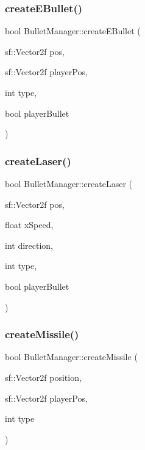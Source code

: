 \subsubsection{\texorpdfstring{create\+E\+Bullet()}{createEBullet()}}
{\footnotesize\ttfamily bool Bullet\+Manager\+::create\+E\+Bullet (\begin{DoxyParamCaption}\item[{sf\+::\+Vector2f}]{pos,  }\item[{sf\+::\+Vector2f}]{player\+Pos,  }\item[{int}]{type,  }\item[{bool}]{player\+Bullet }\end{DoxyParamCaption})}

\mbox{\label{class_bullet_manager_a17d3960ef84f421c8937ed80acd39a8d}} 
\subsubsection{\texorpdfstring{create\+Laser()}{createLaser()}}
{\footnotesize\ttfamily bool Bullet\+Manager\+::create\+Laser (\begin{DoxyParamCaption}\item[{sf\+::\+Vector2f}]{pos,  }\item[{float}]{x\+Speed,  }\item[{int}]{direction,  }\item[{int}]{type,  }\item[{bool}]{player\+Bullet }\end{DoxyParamCaption})}

\mbox{\label{class_bullet_manager_acd15785d7e030d0aecb61c46933d4432}} 
\subsubsection{\texorpdfstring{create\+Missile()}{createMissile()}}
{\footnotesize\ttfamily bool Bullet\+Manager\+::create\+Missile (\begin{DoxyParamCaption}\item[{sf\+::\+Vector2f}]{position,  }\item[{sf\+::\+Vector2f}]{player\+Pos,  }\item[{int}]{type }\end{DoxyParamCaption})}

